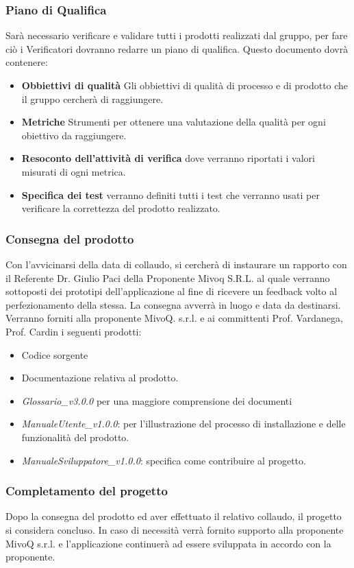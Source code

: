 \documentclass[11pt,a4paper]{article}
\begin{document}
{\subsubsection{Piano di Qualifica}
Sarà necessario verificare e validare tutti i prodotti realizzati dal gruppo, per fare ciò i Verificatori dovranno redarre un piano di qualifica.
Questo documento dovrà contenere:
\begin{itemize}
	\item \textbf{Obbiettivi di qualità} Gli obbiettivi di qualità di processo e di prodotto che il gruppo cercherà di raggiungere.
	\item \textbf{Metriche} Strumenti per ottenere una valutazione della qualità per ogni obiettivo da raggiungere.
	\item \textbf{Resoconto dell'attività di verifica} dove verranno riportati i valori misurati di ogni metrica.
	\item \textbf{Specifica dei test} verranno definiti tutti i test che verranno usati per verificare la correttezza del prodotto realizzato.
\end{itemize}

\subsubsection{Consegna del prodotto}
Con l’avvicinarsi della data di collaudo, si cercherà di instaurare un rapporto con il Referente Dr. Giulio Paci della Proponente Mivoq S.R.L. al quale verranno sottoposti dei prototipi dell’applicazione al fine di ricevere un feedback volto al perfezionamento della stessa.
La consegna avverrà in luogo e data da destinarsi.
Verranno forniti alla proponente MivoQ. s.r.l. e ai committenti Prof. Vardanega, Prof. Cardin i seguenti prodotti:
\begin{itemize}
	\item Codice sorgente
	\item Documentazione relativa al prodotto.
	\item \textit{Glossario\_v3.0.0} per una maggiore comprensione dei documenti
	\item \textit{ManualeUtente\_v1.0.0}: per l'illustrazione del processo di installazione e delle funzionalità del prodotto.
		\item \textit{ManualeSviluppatore\_v1.0.0}: specifica come contribuire al progetto.
\end{itemize}

\subsubsection{Completamento del progetto}
Dopo la consegna del prodotto ed aver effettuato il relativo collaudo, il progetto si considera concluso.
In caso di necessità verrà fornito supporto alla proponente MivoQ s.r.l. e l'applicazione continuerà ad essere sviluppata in accordo con la proponente.

}
\end{document}

